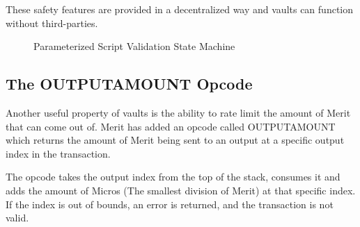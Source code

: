\documentclass{article}
\begin{document}
These safety features are provided in a decentralized way and vaults can function
without third-parties.

\begin{figure}[H]
    \begin{center}
    \end{center}
    \caption{Parameterized Script Validation State Machine}
\end{figure}

\subsection{The OUTPUTAMOUNT Opcode}

\begin{center}
\end{center}

Another useful property of vaults is the ability to rate limit the amount of Merit
that can come out of.  Merit has added an opcode called OUTPUTAMOUNT which
returns the amount of Merit being sent to an output at a specific output index in
the transaction.

The opcode takes the output index from the top of the stack, consumes it and adds the
amount of Micros (The smallest division of Merit) at that specific index.  If the index
is out of bounds, an error is returned, and the transaction is not valid.
\end{document}

